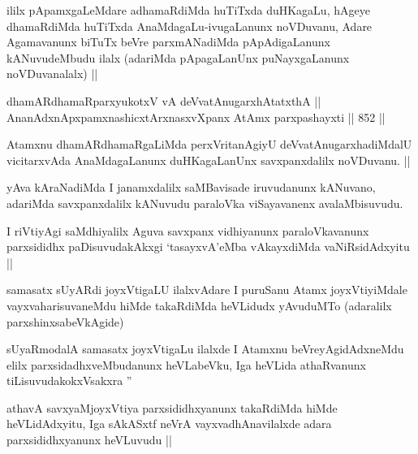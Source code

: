 \begin{artha}
ililx pApamxgaLeMdare adhamaRdiMda huTiTxda duHKagaLu, hAgeye dhamaRdiMda huTiTxda AnaMdagaLu-ivugaLanunx noVDuvanu, Adare Agamavanunx biTuTx beVre parxmANadiMda pApAdigaLanunx kANuvudeMbudu ilalx (adariMda pApagaLanUnx puNayxgaLanunx noVDuvanalalx) ||
\end{artha}


\begin{shl}
dhamARdhamaRparxyukotxV vA deVvatAnugarxhAtatxthA || \\
AnanAdxnApxpamxnashicxtArxnasxvXpanx AtAmx parxpashayxti ||  852 ||  
\end{shl}

\begin{artha}
Atamxnu dhamARdhamaRgaLiMda perxVritanAgiyU deVvatAnugarxhadiMdalU vicitarxvAda AnaMdagaLanunx duHKagaLanUnx savxpanxdalilx noVDuvanu. ||
\end{artha}


\begin{artha}
yAva kAraNadiMda I janamxdalilx saMBavisade iruvudanunx kANuvano, adariMda savxpanxdalilx kANuvudu paraloVka viSayavanenx avalaMbisuvudu.
\end{artha}


\begin{artha}
I riVtiyAgi saMdhiyalilx Aguva savxpanx vidhiyanunx paraloVkavanunx parxsididhx paDisuvudakAkxgi `tasayxvA'eMba vAkayxdiMda vaNiRsidAdxyitu ||
\end{artha}

\begin{artha}
samasatx sUyARdi joyxVtigaLU ilalxvAdare I puruSanu Atamx joyxVtiyiMdale vayxvaharisuvaneMdu hiMde takaRdiMda heVLidudx yAvuduMTo (adaralilx parxshinxsabeVkAgide) 
\end{artha}

\begin{artha}
sUyaRmodalA samasatx joyxVtigaLu ilalxde I Atamxnu beVreyAgidAdxneMdu elilx parxsidadhxveMbudanunx heVLabeVku, Iga heVLida athaRvanunx tiLisuvudakokxVsakxra \stext''
\end{artha}


\begin{artha}
athavA savxyaMjoyxVtiya parxsididhxyanunx takaRdiMda hiMde heVLidAdxyitu, Iga sAkASxtf neVrA vayxvadhAnavilalxde adara parxsididhxyanunx heVLuvudu ||
\end{artha}


